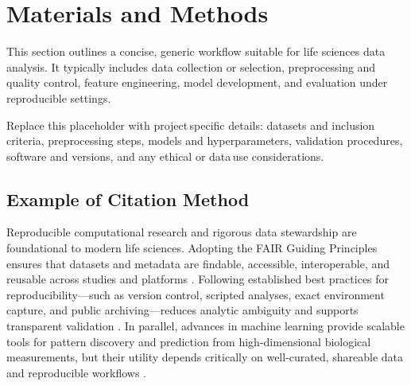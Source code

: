 \section{Materials and Methods}

\noindent This section outlines a concise, generic workflow suitable for life sciences data analysis. It typically includes data collection or selection, preprocessing and quality control, feature engineering, model development, and evaluation under reproducible settings.

\noindent Replace this placeholder with project\,specific details: datasets and inclusion criteria, preprocessing steps, models and hyperparameters, validation procedures, software and versions, and any ethical or data\,use considerations.


\subsection{Example of Citation Method}

\noindent Reproducible computational research and rigorous data stewardship are foundational to modern life sciences. Adopting the FAIR Guiding Principles ensures that datasets and metadata are findable, accessible, interoperable, and reusable across studies and platforms \parencite{wilkinson2016fair}. Following established best practices for reproducibility—such as version control, scripted analyses, exact environment capture, and public archiving—reduces analytic ambiguity and supports transparent validation \parencite{sandve2013reproducible}. In parallel, advances in machine learning provide scalable tools for pattern discovery and prediction from high-dimensional biological measurements, but their utility depends critically on well-curated, shareable data and reproducible workflows \parencite{tarca2007mlbio}.

